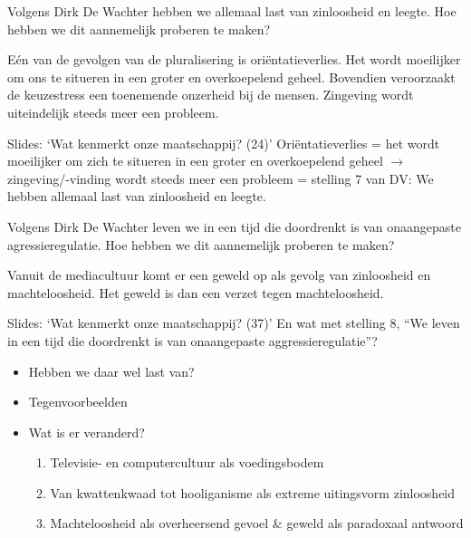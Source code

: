 \documentclass[main.tex]{subfiles}
\begin{document}
\begin{examenvraag}
    \begin{vraag}
        Volgens Dirk De Wachter hebben we allemaal last van zinloosheid en leegte. Hoe hebben we dit aannemelijk proberen te maken?
    \end{vraag}

    \begin{antwoord}
        E\'en van de gevolgen van de pluralisering is ori\"entatieverlies. Het wordt moeilijker om ons te situeren in een groter en overkoepelend geheel. Bovendien veroorzaakt de keuzestress een toenemende onzerheid bij de mensen.
        Zingeving wordt uiteindelijk steeds meer een probleem.
        \begin{citaat}{Slides: `Wat kenmerkt onze maatschappij? (24)'}
            Ori\"entatieverlies = het wordt moeilijker om zich te situeren in een groter en overkoepelend geheel $\rightarrow$ zingeving/-vinding wordt steeds meer een probleem = stelling 7 van DV: We hebben allemaal last van zinloosheid en leegte.
        \end{citaat}
    \end{antwoord}
\end{examenvraag}


\begin{examenvraag}
    \begin{vraag}
        Volgens Dirk De Wachter leven we in een tijd die doordrenkt is van onaangepaste agressieregulatie. Hoe hebben we dit aannemelijk proberen te maken?
    \end{vraag}

    \begin{antwoord}
        Vanuit de mediacultuur komt er een geweld op als gevolg van zinloosheid en machteloosheid.
        Het geweld is dan een verzet tegen machteloosheid.
        \begin{citaat}{Slides: `Wat kenmerkt onze maatschappij? (37)'}
            En wat met stelling 8, ``We leven in een tijd die doordrenkt is van onaangepaste aggressieregulatie''?
            \begin{itemize}
                \item Hebben we daar wel last van?
                \item Tegenvoorbeelden
                \item Wat is er veranderd?
                    \begin{enumerate}
                        \item Televisie- en computercultuur als voedingsbodem
                        \item Van kwattenkwaad tot hooliganisme als extreme uitingsvorm zinloosheid
                        \item Machteloosheid als overheersend gevoel \& geweld als paradoxaal antwoord
                    \end{enumerate}
            \end{itemize}
        \end{citaat}
    \end{antwoord}
\end{examenvraag}
\end{document}
